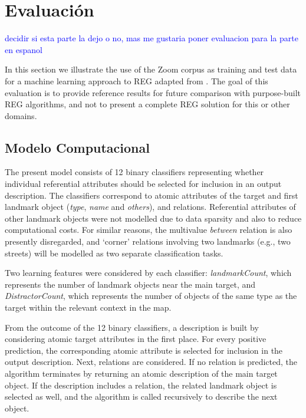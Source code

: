 \section{Evaluaci\'on}
\label{corpus-evaluacion}
\textcolor{blue}{decidir si esta parte la dejo o no, mas me gustaria poner evaluacion para la parte en espanol}

In this section we illustrate the use of the Zoom corpus as training and test data for a machine learning approach to REG adapted from \cite{thiago-svm}. The  goal of this evaluation is to provide reference results for future comparison with purpose-built REG algorithms, and not to present a complete REG solution for this or other domains.

\subsection{Modelo Computacional }

The present model consists of 12 binary classifiers representing whether individual referential attributes should be selected for inclusion in an output description. The classifiers correspond to atomic attributes of the target and first landmark object ({\em type}, {\em name} and {\em others}), and relations. Referential attributes of other landmark objects were not modelled due to data sparsity and also to reduce computational costs. For similar reasons, the multivalue {\em between} relation is also presently disregarded, and `corner' relations involving two landmarks (e.g., two streets) will be modelled as two separate classification tasks.

Two learning features were considered by each classifier: {\em landmarkCount}, which represents the number of landmark objects near the main target, and {\em DistractorCount}, which represents the number of objects of the same type as the target within the relevant context in the map.

From the outcome of the 12 binary classifiers, a description is built by considering atomic target attributes in the first place. For every positive prediction, the corresponding atomic attribute is selected for inclusion in the output description. Next, relations are considered. If no relation is predicted, the algorithm terminates by returning an atomic description  of the main target object. If the description includes a relation, the related landmark object is selected  as well, and the algorithm is called recursively to describe the next object.

